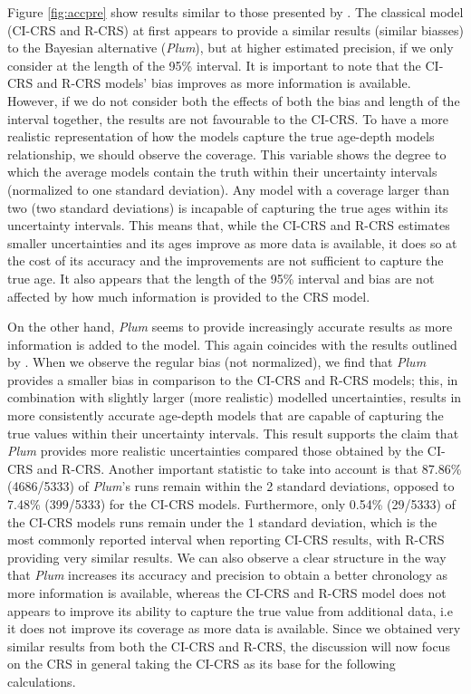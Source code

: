 \documentclass [10pt] {article}
\begin{document}
Figure \ref{fig:accpre} show results similar to those presented by \citet{Blaauw2018}. 
The classical model (CI-CRS and R-CRS) at first appears to provide a similar results (similar biasses) to the Bayesian alternative (\textit{Plum}), but at higher estimated precision, if we only consider at the length of the 95\% interval. 
It is important to note that the CI-CRS and R-CRS models' bias improves as more information is available.
However, if we do not consider both the effects of both the bias and length of the interval together, the results are not favourable to the CI-CRS. 
To have a more realistic representation of how the models capture the true age-depth models relationship, we should observe the coverage. 
This variable shows the degree to which the average models contain the truth within their uncertainty intervals (normalized to one standard deviation). 
Any model with a coverage larger than two (two standard deviations) is incapable of capturing the true ages within its uncertainty intervals.  
This means that, while the CI-CRS and R-CRS estimates smaller uncertainties and its ages improve as more data is available, it does so at the cost of its accuracy and the improvements are not sufficient to capture the true age.
It also appears that the length of the 95\% interval and bias are not affected by how much information is provided to the CRS model. 

On the other hand, \textit{Plum} seems to provide increasingly accurate results as more information is added to the model.
This again coincides with the results outlined by \citet{Blaauw2018}. 
When we observe the regular bias (not normalized), we find that \textit{Plum} provides a smaller bias in comparison to the CI-CRS and R-CRS models; this, in combination with slightly larger (more realistic) modelled uncertainties, results in more consistently accurate age-depth models that are capable of capturing the true values within their uncertainty intervals. 
This result supports the claim that \textit{Plum} provides more realistic uncertainties compared those obtained by the CI-CRS and R-CRS. 
Another important statistic to take into account is that 87.86\% (4686/5333) of \textit{Plum}'s runs remain within the 2 standard deviations, opposed to 7.48\% (399/5333) for the CI-CRS models. Furthermore, only 0.54\% (29/5333) of the CI-CRS models runs remain under the 1 standard deviation, which is the most commonly reported interval when reporting CI-CRS results, with R-CRS providing very similar results.
We can also observe a clear structure in the way that \textit{Plum} increases its accuracy and precision to obtain a better chronology as more information is available, whereas the CI-CRS and R-CRS model does not appears to improve its ability to capture the true value from additional data, i.e it does not improve its coverage as more data is available. 
Since we obtained very similar results from both the CI-CRS and R-CRS, the discussion will now focus on the CRS in general taking the CI-CRS as its base for the following calculations.
\end{document}
